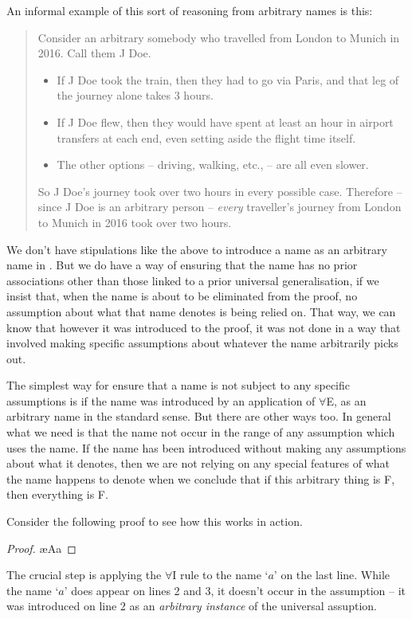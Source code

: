 An informal example of this sort of reasoning from arbitrary names is this: \begin{quote}
	Consider an arbitrary somebody who travelled from London to Munich in 2016. Call them J Doe. \begin{itemize}
		\item  If J Doe took the train, then they had to go via Paris, and that leg of the journey alone takes 3 hours.
		\item  If J Doe flew, then they would have spent at least an hour in airport transfers at each end, even setting aside the flight time itself.
		\item The other options – driving, walking, etc., – are all even slower.
	\end{itemize}
So J Doe’s journey took over two hours in every possible case. Therefore –
since J Doe is an arbitrary person – \emph{every} traveller’s journey from London to Munich in 2016 took over two hours.
\end{quote}


We don't have stipulations like the above to introduce a name as an arbitrary name in \FOL. But we do have a way of ensuring that the name has no prior associations other than those linked to a prior universal generalisation, if we insist that,  when the name is about to be eliminated from the proof, no assumption about what that name denotes is being relied on. That way, we can know that however it was introduced to the proof, it was not done in a way that involved making specific assumptions about whatever the name arbitrarily picks out. 

The simplest way for ensure that a name is not subject to any specific assumptions is if the name was introduced by an application of $\forall$E, as an arbitrary name in the standard sense. But there are other ways too. In general what we need is that the name not occur in the range of any assumption which uses the name. If the name has been introduced without making any assumptions about what it denotes, then we are not relying on any special features of what the name happens to denote when we conclude that if this arbitrary thing is F, then everything is F. 

Consider the following proof to see how this works in action. \begin{proof}
    	\ae{Aa}
    \end{proof}
The crucial step is applying the $\forall$I rule  to the name `$a$' on the last line. While the name `$a$' does appear on lines 2 and 3, it doesn't occur in the assumption – it was introduced on line 2 as an \emph{arbitrary instance} of the universal assuption. 


